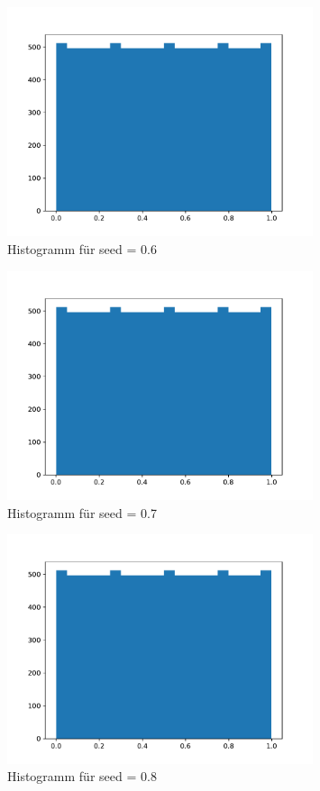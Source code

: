 \begin{figure}[H]
  \centering
  \includegraphics[width=0.8\textwidth]{nr8_c_seed=0.6.pdf}
  \caption{Histogramm für seed = 0.6}
\end{figure}

\begin{figure}[H]
  \centering
  \includegraphics[width=0.8\textwidth]{nr8_c_seed=0.7.pdf}
  \caption{Histogramm für seed = 0.7}
\end{figure}

\begin{figure}[H]
  \centering
  \includegraphics[width=0.8\textwidth]{nr8_c_seed=0.8.pdf}
  \caption{Histogramm für seed = 0.8}
\end{figure}

